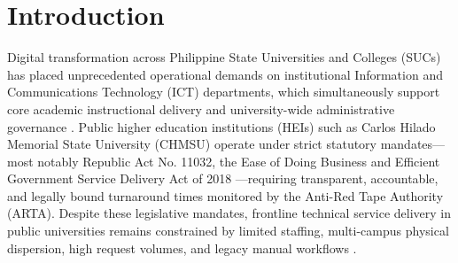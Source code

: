\documentclass[conference]{IEEEtran}
\begin{document}
\section{Introduction}
Digital transformation across Philippine State Universities and Colleges (SUCs) has placed unprecedented operational demands on institutional Information and Communications Technology (ICT) departments, which simultaneously support core academic instructional delivery and university-wide administrative governance \cite{ref1, ref2}. Public higher education institutions (HEIs) such as Carlos Hilado Memorial State University (CHMSU) operate under strict statutory mandates---most notably Republic Act No. 11032, the Ease of Doing Business and Efficient Government Service Delivery Act of 2018 \cite{ref1}---requiring transparent, accountable, and legally bound turnaround times monitored by the Anti-Red Tape Authority (ARTA). Despite these legislative mandates, frontline technical service delivery in public universities remains constrained by limited staffing, multi-campus physical dispersion, high request volumes, and legacy manual workflows \cite{ref2, ref3}.
\end{document}
